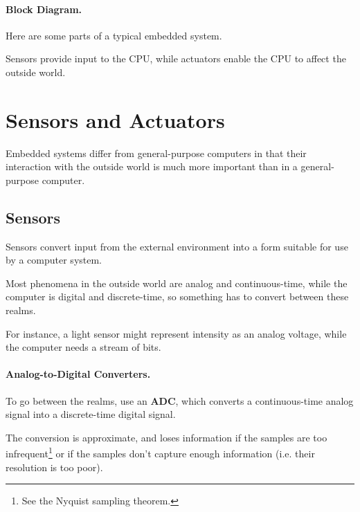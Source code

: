 \paragraph{Block Diagram.} Here are some parts of a typical
embedded system.

\begin{center}
\end{center}
Sensors provide input to the CPU, while actuators enable the CPU
to affect the outside world.

\section*{Sensors and Actuators}
Embedded systems differ from general-purpose computers in that their
interaction with the outside world is much more important than in a
general-purpose computer.


\subsection*{Sensors} Sensors convert input from the external environment
into a form suitable for use by a computer system.

Most phenomena in the outside world are analog and continuous-time,
while the computer is digital and discrete-time, so something has to
convert between these realms.

For instance, a light sensor might represent intensity as an
analog voltage, while the computer needs a stream of bits.

\paragraph{Analog-to-Digital Converters.} To go between the realms,
use an {\bf ADC}, which converts a continuous-time analog signal into a
discrete-time digital signal.

The conversion is approximate, and loses information if the samples are
too infrequent\footnote{See the Nyquist sampling theorem.} or if the
samples don't capture enough information (i.e. their resolution is too poor).

